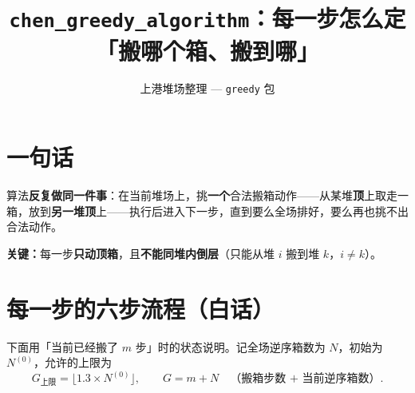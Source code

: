 \documentclass[11pt,a4paper]{ctexart}
\title{\texttt{chen\_greedy\_algorithm}：每一步怎么定「搬哪个箱、搬到哪」}
\author{上港堆场整理 --- \texttt{greedy} 包}
\date{}
\newcommand{\capG}{G_{\mathrm{上限}}}
\begin{document}
\maketitle

\section{一句话}

算法\textbf{反复做同一件事}：在当前堆场上，挑\textbf{一个}合法搬箱动作——从某堆\textbf{顶}上取走一箱，放到\textbf{另一堆顶}上——执行后进入下一步，直到要么全场排好，要么再也挑不出合法动作。

\textbf{关键：}每一步\textbf{只动顶箱}，且\textbf{不能同堆内倒层}（只能从堆 $i$ 搬到堆 $k$，$i\neq k$）。

\section{每一步的六步流程（白话）}

下面用「当前已经搬了 $m$ 步」时的状态说明。记全场逆序箱数为 $N$，初始为 $N^{(0)}$，允许的上限为
\[
  \capG = \bigl\lfloor 1.3 \times N^{(0)} \bigr\rfloor,
  \qquad
  G = m + N \quad \text{（搬箱步数 + 当前逆序箱数）}.
\]
\end{document}
